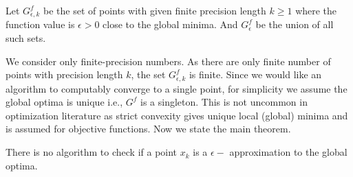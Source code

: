 	\begin{definition}
		Let $G^f_{\epsilon,k}$ be the set of points with given finite precision length $k \geq 1$ where the function value is $\epsilon > 0$ close to the global minima. And $G^f_{\epsilon}$ be the union of all such sets.
	\end{definition} %
	We consider only finite-precision numbers. %
	As there are only finite number of points with precision length $k$, the set $G^f_{\epsilon,k}$ is finite. 
	Since we would like an algorithm to computably converge to a single point, for simplicity we assume the global optima is unique i.e., $G^f$ is a singleton. This is not uncommon in optimization literature as strict convexity gives unique local (global) minima and is assumed for objective functions. Now we state the main theorem.
	
	\begin{lemma}\label{checklem}
		There is no algorithm to check if a point $x_k$ is a $\epsilon-$ approximation  to the global optima.
	\end{lemma}
	
